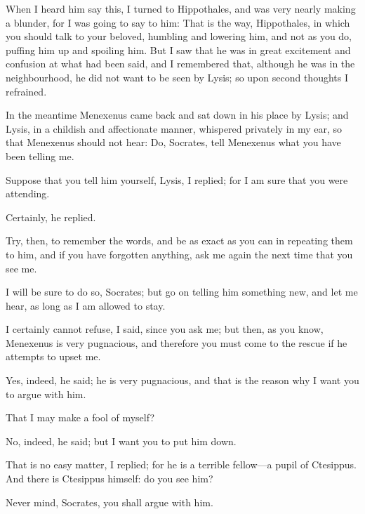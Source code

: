 \documentclass[11pt,letter]{article}
\begin{document}
\par  When I heard him say this, I turned to Hippothales, and was very nearly making a blunder, for I was going to say to him: That is the way, Hippothales, in which you should talk to your beloved, humbling and lowering him, and not as you do, puffing him up and spoiling him. But I saw that he was in great excitement and confusion at what had been said, and I remembered that, although he was in the neighbourhood, he did not want to be seen by Lysis; so upon second thoughts I refrained.

\par  In the meantime Menexenus came back and sat down in his place by Lysis; and Lysis, in a childish and affectionate manner, whispered privately in my ear, so that Menexenus should not hear: Do, Socrates, tell Menexenus what you have been telling me.

\par  Suppose that you tell him yourself, Lysis, I replied; for I am sure that you were attending.

\par  Certainly, he replied.

\par  Try, then, to remember the words, and be as exact as you can in repeating them to him, and if you have forgotten anything, ask me again the next time that you see me.

\par  I will be sure to do so, Socrates; but go on telling him something new, and let me hear, as long as I am allowed to stay.

\par  I certainly cannot refuse, I said, since you ask me; but then, as you know, Menexenus is very pugnacious, and therefore you must come to the rescue if he attempts to upset me.

\par  Yes, indeed, he said; he is very pugnacious, and that is the reason why I want you to argue with him.

\par  That I may make a fool of myself?

\par  No, indeed, he said; but I want you to put him down.

\par  That is no easy matter, I replied; for he is a terrible fellow—a pupil of Ctesippus. And there is Ctesippus himself: do you see him?

\par  Never mind, Socrates, you shall argue with him.
\end{document}
